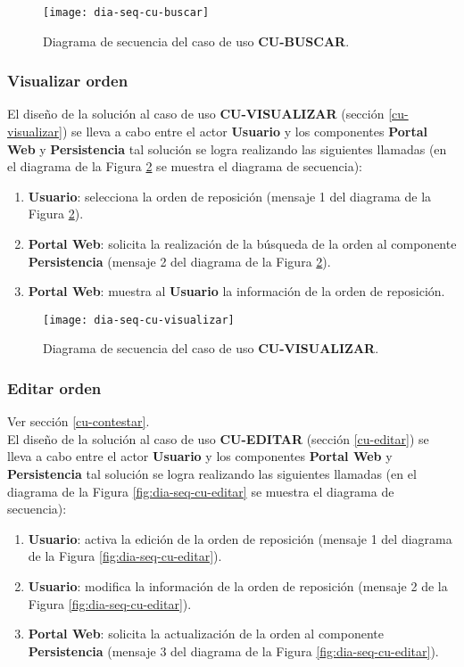 \begin{figure}[h]
	\centering
	\texttt{[image: dia-seq-cu-buscar]}
	\caption{Diagrama de secuencia del caso de uso \textbf{CU-BUSCAR}.}
	\label{fig:dia-seq-cu-buscar}
\end{figure}

\subsubsection{Visualizar orden}
El diseño de la solución al caso de uso \textbf{CU-VISUALIZAR} (sección \ref{cu-visualizar}) se lleva a cabo entre el actor \textbf{Usuario} y los componentes \textbf{Portal Web} y \textbf{Persistencia} tal solución se logra realizando las siguientes llamadas (en el diagrama de la Figura \ref{fig:dia-seq-cu-visualizar} se muestra el diagrama de secuencia):
\begin{enumerate}
	\item \textbf{Usuario}: selecciona la orden de reposición (mensaje 1 del diagrama de la Figura \ref{fig:dia-seq-cu-visualizar}).
	\item \textbf{Portal Web}: solicita la realización de la búsqueda de la orden al componente \textbf{Persistencia} (mensaje 2 del diagrama de la Figura \ref{fig:dia-seq-cu-visualizar}).
	\item \textbf{Portal Web}: muestra al \textbf{Usuario} la información de la orden de reposición.
\end{enumerate}

\begin{figure}[h]
	\centering
	\texttt{[image: dia-seq-cu-visualizar]}
	\caption{Diagrama de secuencia del caso de uso \textbf{CU-VISUALIZAR}.}
	\label{fig:dia-seq-cu-visualizar}
\end{figure}

\subsubsection{Editar orden}
Ver sección \ref{cu-contestar}.\\
El diseño de la solución al caso de uso \textbf{CU-EDITAR} (sección \ref{cu-editar}) se lleva a cabo entre el actor \textbf{Usuario} y los componentes \textbf{Portal Web} y \textbf{Persistencia} tal solución se logra realizando las siguientes llamadas (en el diagrama de la Figura \ref{fig:dia-seq-cu-editar} se muestra el diagrama de secuencia):
\begin{enumerate}
	\item \textbf{Usuario}: activa la edición de la orden de reposición (mensaje 1 del diagrama de la Figura \ref{fig:dia-seq-cu-editar}).
	\item \textbf{Usuario}: modifica la información de la orden de reposición (mensaje 2 de la Figura \ref{fig:dia-seq-cu-editar}).
	\item \textbf{Portal Web}: solicita la actualización de la orden al componente \textbf{Persistencia} (mensaje 3 del diagrama de la Figura \ref{fig:dia-seq-cu-editar}).
\end{enumerate}

